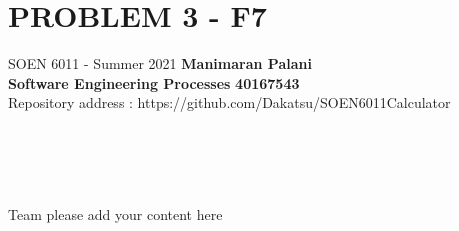 \documentclass[a4paper, 11pt]{report}
\begin{document}
\section*{PROBLEM 3 - F7}
\normalsize {SOEN 6011 - Summer 2021} \hfill \textbf{Manimaran Palani} \\
\textbf{ Software Engineering Processes}  \hfill \textbf{40167543} \\
\hfill Repository address : https://github.com/Dakatsu/SOEN6011Calculator
\\\\\\\\\\
 \begin{center} Team please add your content here \end{center}
\end{document}
